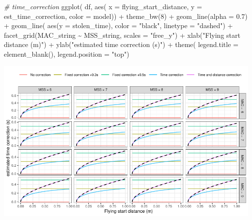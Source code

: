 \documentclass[fleqn,10pt,lineno]{wlpeerj} %
\newenvironment{Shaded}{\begin{snugshade}}{\end{snugshade}}
\newcommand{\AttributeTok}[1]{\textcolor[rgb]{0.77,0.63,0.00}{#1}}
\newcommand{\CommentTok}[1]{\textcolor[rgb]{0.56,0.35,0.01}{\textit{#1}}}
\newcommand{\DecValTok}[1]{\textcolor[rgb]{0.00,0.00,0.81}{#1}}
\newcommand{\FloatTok}[1]{\textcolor[rgb]{0.00,0.00,0.81}{#1}}
\newcommand{\FunctionTok}[1]{\textcolor[rgb]{0.00,0.00,0.00}{#1}}
\newcommand{\NormalTok}[1]{#1}
\newcommand{\SpecialCharTok}[1]{\textcolor[rgb]{0.00,0.00,0.00}{#1}}
\newcommand{\StringTok}[1]{\textcolor[rgb]{0.31,0.60,0.02}{#1}}
\begin{document}
\begin{Shaded}
\begin{Highlighting}[]
\CommentTok{\# time\_correction}
\FunctionTok{ggplot}\NormalTok{(}
\NormalTok{  df,}
  \FunctionTok{aes}\NormalTok{(}
    \AttributeTok{x =}\NormalTok{ flying\_start\_distance,}
    \AttributeTok{y =}\NormalTok{ est\_time\_correction,}
    \AttributeTok{color =}\NormalTok{ model)) }\SpecialCharTok{+}
  \FunctionTok{theme\_bw}\NormalTok{(}\DecValTok{8}\NormalTok{) }\SpecialCharTok{+}
  \FunctionTok{geom\_line}\NormalTok{(}\AttributeTok{alpha =} \FloatTok{0.7}\NormalTok{) }\SpecialCharTok{+}
  \FunctionTok{geom\_line}\NormalTok{(}
    \FunctionTok{aes}\NormalTok{(}\AttributeTok{y =}\NormalTok{ stolen\_time), }\AttributeTok{color =} \StringTok{"black"}\NormalTok{, }\AttributeTok{linetype =} \StringTok{"dashed"}\NormalTok{) }\SpecialCharTok{+}
  \FunctionTok{facet\_grid}\NormalTok{(MAC\_string }\SpecialCharTok{\textasciitilde{}}\NormalTok{ MSS\_string, }\AttributeTok{scales =} \StringTok{"free\_y"}\NormalTok{) }\SpecialCharTok{+}
  \FunctionTok{xlab}\NormalTok{(}\StringTok{"Flying start distance (m)"}\NormalTok{) }\SpecialCharTok{+}
  \FunctionTok{ylab}\NormalTok{(}\StringTok{"estimated time correction (s)"}\NormalTok{)  }\SpecialCharTok{+}
  \FunctionTok{theme}\NormalTok{(}
    \AttributeTok{legend.title =} \FunctionTok{element\_blank}\NormalTok{(),}
    \AttributeTok{legend.position =} \StringTok{"top"}\NormalTok{)}
\end{Highlighting}
\end{Shaded}

\begin{center}\includegraphics[width=1\linewidth]{paper_files/figure-latex/unnamed-chunk-45-1} \end{center}
\end{document}
